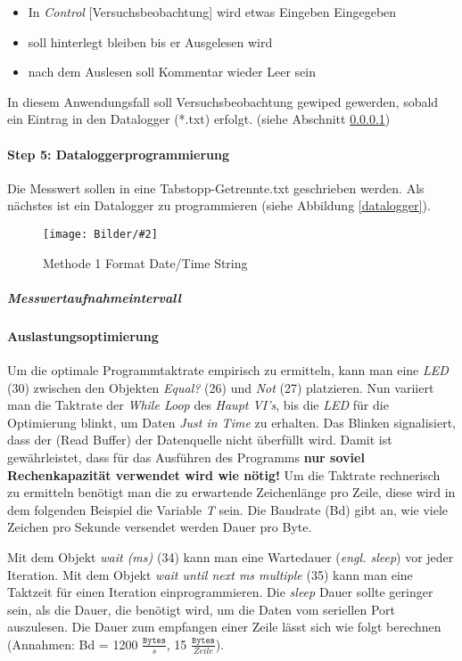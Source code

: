 \documentclass[
fontsize=12pt, 
paper=a4, 
BCOR=10mm, 
twoside=false,
 DIV=10, 
 headsepline, 
 footsepline
 ]{scrartcl}
\def\bild#1#2#3#4#5#6{%
\begin{figure}[h!] %
\centering
\texttt{[image: Bilder/\#2]}
\vspace{#3}
\caption[#4]{#5}\label{#6}
\end{figure}
}
\begin{document}
\begin{itemize}
\item In \textit{Control} [Versuchsbeobachtung] wird etwas Eingeben Eingegeben
\item soll hinterlegt bleiben bis er Ausgelesen wird
\item nach dem Auslesen soll Kommentar wieder Leer sein
\end{itemize}
 
In diesem Anwendungsfall soll Versuchsbeobachtung gewiped gewerden, sobald ein Eintrag in den Datalogger (*.txt) erfolgt. (siehe Abschnitt \ref{sec:Datalogger})


\paragraph{Step 5: Dataloggerprogrammierung}
\label{sec:Datalogger}

Die Messwert sollen in eine Tabstopp-Getrennte.txt geschrieben werden. Als nächstes ist ein Datalogger zu programmieren (siehe Abbildung \ref{datalogger}).

\bild{0.4}
{LabVIEW_serialport/step7_format_date-time.png}
{0em}
{Methode 1 \glqq Format Date/Time String\grqq{}}
{Methode 1 \glqq Format Date/Time String\grqq{}}
{step7_format_date-time}


\subparagraph{Messwertaufnahmeintervall}

\paragraph{Auslastungsoptimierung} Um die optimale Programmtaktrate empirisch zu ermitteln, kann man eine \textit{LED} (30) zwischen den Objekten \textit{Equal?} (26) und \textit{Not} (27) platzieren. Nun variiert man die Taktrate der \textit{While Loop} des  \textit{Haupt VI's}, bis die \textit{LED} für die Optimierung blinkt, um Daten \textit{Just in Time} zu erhalten. Das Blinken signalisiert, dass der (Read Buffer) der Datenquelle nicht überfüllt wird. Damit ist gewährleistet, dass für das Ausführen des Programms \textbf{ nur soviel Rechenkapazität verwendet wird wie nötig!} Um die Taktrate rechnerisch zu ermitteln benötigt man die zu erwartende Zeichenlänge pro Zeile, diese wird in dem folgenden Beispiel die Variable \textit{T} sein. Die Baudrate (Bd) gibt an, wie viele Zeichen pro Sekunde versendet werden Dauer pro Byte.

Mit dem Objekt \textit{wait (ms)} (34) kann man eine Wartedauer (\textit{engl. sleep}) vor jeder Iteration. Mit dem Objekt \textit{wait until next ms multiple} (35) kann man eine Taktzeit für einen Iteration einprogrammieren. Die \textit{sleep} Dauer sollte geringer sein, als die Dauer, die benötigt wird, um die Daten vom seriellen Port auszulesen. Die Dauer zum empfangen einer Zeile lässt sich wie folgt berechnen (Annahmen: Bd = 1200 $\frac{\texttt{Bytes}}{s}$, 15 $\frac{\texttt{Bytes}}{Zeile}$). 
\end{document}
